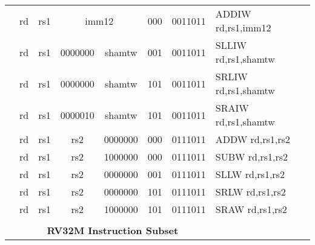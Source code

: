 \begin{table}[p]
\begin{small}
\begin{center}
\begin{tabular}{rccccccccccl}
&
\multicolumn{1}{|c|}{rd} &
\multicolumn{1}{c|}{rs1} &
\multicolumn{5}{c|}{imm12} &
\multicolumn{2}{c|}{000} &
\multicolumn{1}{c|}{0011011} & ADDIW rd,rs1,imm12 \\
\cline{2-11}
  

&
\multicolumn{1}{|c|}{rd} &
\multicolumn{1}{c|}{rs1} &
\multicolumn{3}{c|}{0000000} &
\multicolumn{2}{c|}{shamtw} &
\multicolumn{2}{c|}{001} &
\multicolumn{1}{c|}{0011011} & SLLIW rd,rs1,shamtw \\
\cline{2-11}
  

&
\multicolumn{1}{|c|}{rd} &
\multicolumn{1}{c|}{rs1} &
\multicolumn{3}{c|}{0000000} &
\multicolumn{2}{c|}{shamtw} &
\multicolumn{2}{c|}{101} &
\multicolumn{1}{c|}{0011011} & SRLIW rd,rs1,shamtw \\
\cline{2-11}
  

&
\multicolumn{1}{|c|}{rd} &
\multicolumn{1}{c|}{rs1} &
\multicolumn{3}{c|}{0000010} &
\multicolumn{2}{c|}{shamtw} &
\multicolumn{2}{c|}{101} &
\multicolumn{1}{c|}{0011011} & SRAIW rd,rs1,shamtw \\
\cline{2-11}
  

&
\multicolumn{1}{|c|}{rd} &
\multicolumn{1}{c|}{rs1} &
\multicolumn{1}{c|}{rs2} &
\multicolumn{4}{c|}{0000000} &
\multicolumn{2}{c|}{000} &
\multicolumn{1}{c|}{0111011} & ADDW rd,rs1,rs2 \\
\cline{2-11}
  

&
\multicolumn{1}{|c|}{rd} &
\multicolumn{1}{c|}{rs1} &
\multicolumn{1}{c|}{rs2} &
\multicolumn{4}{c|}{1000000} &
\multicolumn{2}{c|}{000} &
\multicolumn{1}{c|}{0111011} & SUBW rd,rs1,rs2 \\
\cline{2-11}
  

&
\multicolumn{1}{|c|}{rd} &
\multicolumn{1}{c|}{rs1} &
\multicolumn{1}{c|}{rs2} &
\multicolumn{4}{c|}{0000000} &
\multicolumn{2}{c|}{001} &
\multicolumn{1}{c|}{0111011} & SLLW rd,rs1,rs2 \\
\cline{2-11}
  

&
\multicolumn{1}{|c|}{rd} &
\multicolumn{1}{c|}{rs1} &
\multicolumn{1}{c|}{rs2} &
\multicolumn{4}{c|}{0000000} &
\multicolumn{2}{c|}{101} &
\multicolumn{1}{c|}{0111011} & SRLW rd,rs1,rs2 \\
\cline{2-11}
  

&
\multicolumn{1}{|c|}{rd} &
\multicolumn{1}{c|}{rs1} &
\multicolumn{1}{c|}{rs2} &
\multicolumn{4}{c|}{1000000} &
\multicolumn{2}{c|}{101} &
\multicolumn{1}{c|}{0111011} & SRAW rd,rs1,rs2 \\
\cline{2-11}
  

&
\multicolumn{10}{c}{} & \\
&
\multicolumn{10}{c}{\bf RV32M Instruction Subset} & \\
\cline{2-11}
  


\end{tabular}
\end{center}
\end{small}
\end{table}
